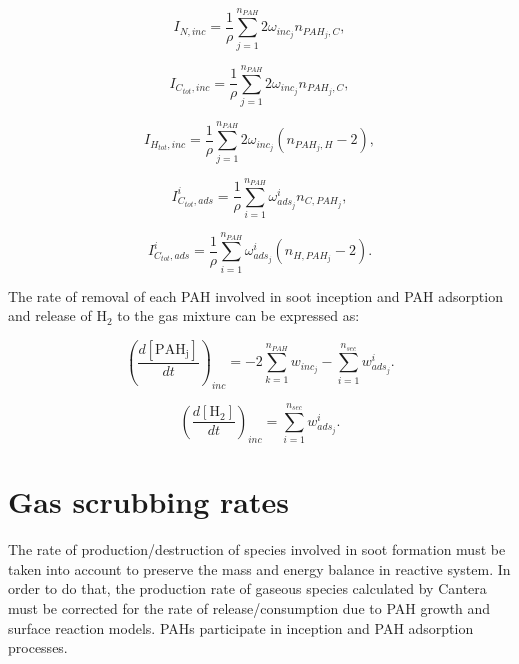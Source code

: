\begin{equation}
	I_{N,{inc}} = \frac{1}{\rho}
	\sum_{j=1}^{n_{PAH}}
	2\omega_{inc_{j}} 
	n_{PAH_j,C}
	\label{eqn:IN_inc_ebri},
\end{equation}

\begin{equation}
	I_{C_{tot},{inc}} = \frac{1}{\rho}
	\sum_{j=1}^{n_{PAH}}
	2\omega_{inc_{j}} 
	n_{PAH_j,C}
	\label{eqn:ICtot_inc_ebri},
\end{equation}

\begin{equation}
	I_{H_{tot},{inc}} = \frac{1}{\rho}
	\sum_{j=1}^{n_{PAH}}
	2\omega_{inc_{j}} 
	\left(
	n_{PAH_j,H}-2
	\right)
	\label{eqn:IHtot_inc_ebri},
\end{equation}

\begin{equation}
	I^i_{C_{tot},ads} =
	\frac{1}{\rho}
	\sum_{i=1}^{n_{PAH}}
	\omega^i_{ads_j}
	n_{C,PAH_j}
	\label{eqn:ICtotads_ebri},
\end{equation}

\begin{equation}
	I^i_{C_{tot},ads} =
	\frac{1}{\rho}
	\sum_{i=1}^{n_{PAH}}
	\omega^i_{ads_j}
	\left(n_{H,PAH_j}-2\right)
	\label{eqn:IHtotads_ebri}.
\end{equation}

The rate of removal of each PAH involved in soot inception and PAH adsorption and release of $\mathrm{H_2}$ to the gas mixture can be expressed as:

\begin{equation}
	\left(
	\frac{d\left[{\mathrm{PAH_j}}\right]}{dt}
	\right)_{inc}
	= 
	-2\sum_{k=1}^{n_{PAH}}w_{inc_{j}}-\sum_{i=1}^{n_{sec}}w^i_{ads_j}
	\label{eqn:PAHscrub_ebri}.
\end{equation}

\begin{equation}
	\left(
	\frac{d\left[{\mathrm{H_2}}\right]}{dt}
	\right)_{inc}
	= 
	\sum_{i=1}^{n_{sec}}w^i_{ads_j}
	\label{eqn:H2scrub_ebri}.
\end{equation}

\section{Gas scrubbing rates}

The rate of production/destruction of species involved in soot formation must be taken into account to preserve the mass and energy balance in reactive system. In order to do that, the production rate of gaseous species calculated by Cantera must be corrected for the rate of release/consumption due to PAH growth and surface reaction models. PAHs participate in inception and PAH adsorption processes.


